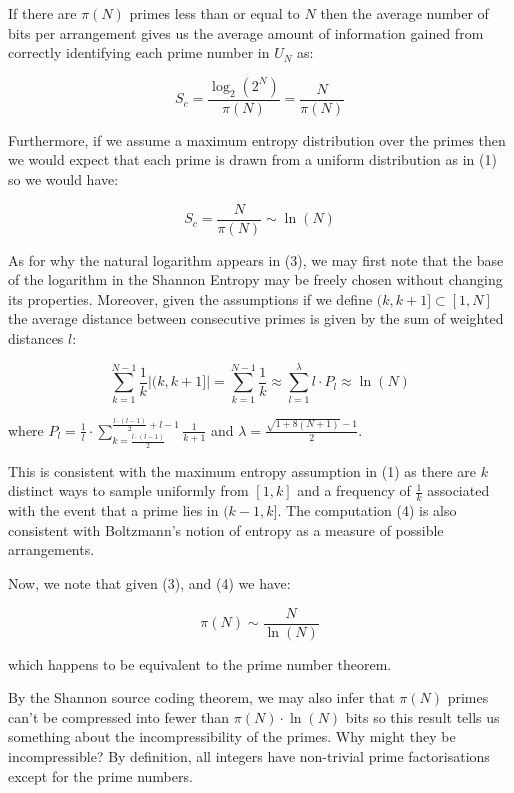 \documentclass{article}
\begin{document}
If there are $\pi(N)$ primes less than or equal to $N$ then the average number of bits per arrangement gives us the average amount of information gained from correctly identifying each prime number in $U_N$ as:

\begin{equation}
S_c = \frac{\log_2 (2^N)}{\pi(N)}= \frac{N}{\pi(N)} \tag{2}
\end{equation}

Furthermore, if we assume a maximum entropy distribution over the primes then we would expect that each prime is drawn from a uniform distribution as in (1) so we would have:

\begin{equation}
S_c = \frac{N}{\pi(N)} \sim \ln(N) \tag{3}
\end{equation}

As for why the natural logarithm appears in (3), we may first note that the base of the logarithm in the Shannon Entropy may be freely chosen without changing its properties. Moreover, given the assumptions if we define $(k,k+1] \subset [1,N]$ the average distance between consecutive primes is given by the sum of weighted distances $l$: 

\begin{equation}
\sum_{k=1}^{N-1} \frac{1}{k} \lvert (k,k+1] \rvert = \sum_{k=1}^{N-1} \frac{1}{k} \approx \sum_{l=1}^\lambda l \cdot P_l \approx \ln(N) \tag{4}
\end{equation}

where $P_l = \frac{1}{l} \cdot \sum_{k= \frac{l \cdot (l-1)}{2}}^{\frac{l\cdot (l-1)}{2}+l-1} \frac{1}{k+1}$ and  $\lambda = \frac{\sqrt{1+8(N+1)}-1}{2}$. 

This is consistent with the maximum entropy assumption in (1) as there are $k$ distinct ways to sample uniformly from $[1,k]$ and a frequency of $\frac{1}{k}$ associated with the event that a prime lies in $(k-1,k]$. The computation (4) is also consistent with Boltzmann's notion of entropy as a measure of possible arrangements. 

Now, we note that given (3), and (4) we have: 

\begin{equation}
\pi(N) \sim \frac{N}{\ln(N)} \tag{5}
\end{equation}

which happens to be equivalent to the prime number theorem.

By the Shannon source coding theorem, we may also infer that $\pi(N)$ primes can't be compressed into fewer than $\pi(N) \cdot \ln(N)$ bits so this result tells us something about the incompressibility of the primes. Why might they be incompressible? By definition, all integers have non-trivial prime factorisations except for the prime numbers. 
\end{document}
